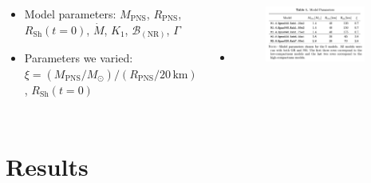 \documentclass{beamer}
\newcommand{\msun}{M_{\odot}}
\newcommand{\nr}{\mathrm{NR}}
\newcommand{\mpns}{M_{\mathrm{PNS}}}
\newcommand{\rpns}{R_{\mathrm{PNS}}}
\newcommand{\rsh}{R_{\mathrm{Sh}}}
\newcommand{\mdot}{\dot{M}}
\begin{document}
\begin{frame}

  \begin{columns}[c]


      \begin{itemize}[<+->]
        \item[]
          Model parameters:
          $\mpns$, $\rpns$, $\rsh\left(t=0\right)$, $\mdot$, $K_{1}$,
          $\mathcal{B}_{\left(\nr\right)}$, $\Gamma$\\[1em]
        \item[]
          Parameters we varied:
          $\xi=\left(\mpns/\msun\right)/\left(\rpns/20\,\mathrm{km}\right)$
          \citep{oo2011},
          $\rsh\left(t=0\right)$
      \end{itemize}


      \begin{itemize}[<+->]
        \item[]
            \begin{figure}[ht]
              \centering
              \includegraphics[width=0.9\textwidth]{fig.paramspace.png}
          \end{figure}
      \end{itemize}

  \end{columns}

\end{frame}

\section{Results}
\end{document}
